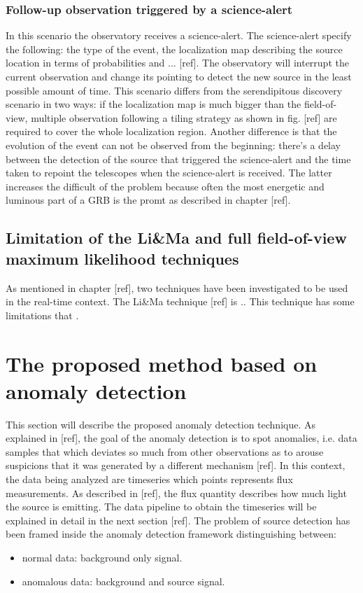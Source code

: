 \subsubsection{Follow-up observation triggered by a science-alert}
In this scenario the observatory receives a science-alert. The science-alert specify the following: the type of the event, the localization map describing the source location in terms of probabilities and ... [ref]. The observatory will interrupt the current observation and change its pointing to detect the new source in the least possible amount of time. This scenario differs from the serendipitous discovery scenario in two ways: if the localization map is much bigger than the field-of-view, multiple observation following a tiling strategy as shown in fig. [ref] are required to cover the whole localization region. Another difference is that the evolution of the event can not be observed from the beginning: there's a delay between the detection of the source that triggered the science-alert and the time taken to repoint the telescopes when the science-alert is received. The latter increases the difficult of the problem because often the most energetic and luminous part of a GRB is the promt as described in chapter [ref]. 


\subsection{Limitation of the Li\&Ma and full field-of-view maximum likelihood techniques}
\label{s:Contribution-2-Major-1-Minor-1}
As mentioned in chapter [ref], two techniques have been investigated to be used in the real-time context. The Li\&Ma technique [ref] is ..
This technique has some limitations that . 

\section{The proposed method based on anomaly detection}
\label{s:Contribution-1-anomaly-detection}
This section will describe the proposed anomaly detection technique. As explained in [ref], the goal of the anomaly detection is to spot anomalies, i.e. data samples that which deviates so much from other observations as to arouse suspicions that it was generated by a different mechanism [ref]. In this context, the data being analyzed are timeseries which points represents flux measurements. As described in [ref], the flux quantity describes how much light the source is emitting. The data pipeline to obtain the timeseries will be explained in detail in the next section [ref]. The problem of source detection has been framed inside the anomaly detection framework distinguishing between:
\begin{itemize}
	\item normal data: background only signal. 
	\item anomalous data: background and source signal.
\end{itemize}







